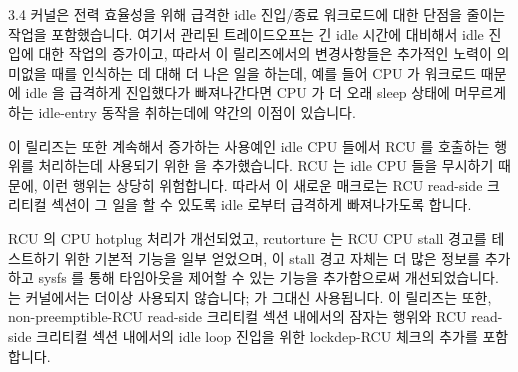 3.4 커널은 전력 효율성을 위해 급격한 idle 진입/종료 워크로드에 대한 단점을
줄이는 작업을 포함했습니다.
여기서 관리된 트레이드오프는 긴 idle 시간에 대비해서 idle 진입에 대한 작업의
증가이고, 따라서 이 릴리즈에서의 변경사항들은 추가적인 노력이 의미없을 때를
인식하는 데 대해 더 나은 일을 하는데, 예를 들어 CPU 가 워크로드 때문에 idle 을
급격하게 진입했다가 빠져나간다면 CPU 가 더 오래 sleep 상태에 머무르게 하는
idle-entry 동작을 취하는데에 약간의 이점이 있습니다.

이 릴리즈는 또한 계속해서 증가하는 사용예인 idle CPU 들에서 RCU 를 호출하는
행위를 처리하는데 사용되기 위한  을 추가했습니다.
RCU 는 idle CPU 들을 무시하기 때문에, 이런 행위는 상당히 위험합니다.
따라서 이 새로운  매크로는 RCU read-side 크리티컬 섹션이 그
일을 할 수 있도록 idle 로부터 급격하게 빠져나가도록 합니다.

RCU 의 CPU hotplug 처리가 개선되었고, rcutorture 는 RCU CPU stall 경고를
테스트하기 위한 기본적 기능을 일부 얻었으며, 이 stall 경고 자체는 더 많은
정보를 추가하고 sysfs 를 통해 타임아웃을 제어할 수 있는 기능을 추가함으로써
개선되었습니다.
 는  커널에서는 더이상 사용되지 않습니다;
 가 그대신 사용됩니다.
이 릴리즈는 또한, non-preemptible-RCU read-side 크리티컬 섹션 내에서의 잠자는
행위와 RCU read-side 크리티컬 섹션 내에서의 idle loop 진입을 위한 lockdep-RCU
체크의 추가를 포함합니다.

